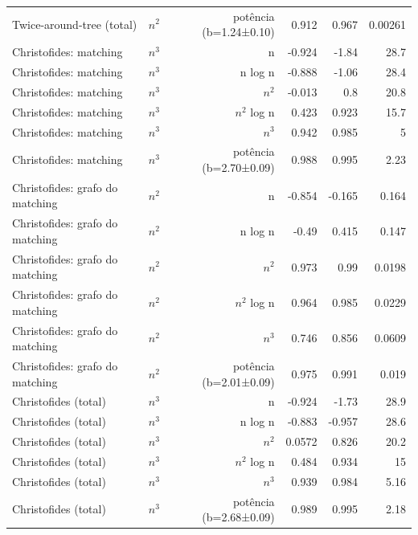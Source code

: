 \begin{tabular}{lrrrrr}
Twice-around-tree (total) & $n^{2}$ & potência (b=1.24±0.10) & 0.912 & 0.967 & 0.00261 \\
Christofides: matching & $n^{3}$ & n & -0.924 & -1.84 & 28.7 \\
Christofides: matching & $n^{3}$ & n log n & -0.888 & -1.06 & 28.4 \\
Christofides: matching & $n^{3}$ & $n^{2}$ & -0.013 & 0.8 & 20.8 \\
Christofides: matching & $n^{3}$ & $n^{2}$ log n & 0.423 & 0.923 & 15.7 \\
Christofides: matching & $n^{3}$ & $n^{3}$ & 0.942 & 0.985 & 5 \\
Christofides: matching & $n^{3}$ & potência (b=2.70±0.09) & 0.988 & 0.995 & 2.23 \\
Christofides: grafo do matching & $n^{2}$ & n & -0.854 & -0.165 & 0.164 \\
Christofides: grafo do matching & $n^{2}$ & n log n & -0.49 & 0.415 & 0.147 \\
Christofides: grafo do matching & $n^{2}$ & $n^{2}$ & 0.973 & 0.99 & 0.0198 \\
Christofides: grafo do matching & $n^{2}$ & $n^{2}$ log n & 0.964 & 0.985 & 0.0229 \\
Christofides: grafo do matching & $n^{2}$ & $n^{3}$ & 0.746 & 0.856 & 0.0609 \\
Christofides: grafo do matching & $n^{2}$ & potência (b=2.01±0.09) & 0.975 & 0.991 & 0.019 \\
Christofides (total) & $n^{3}$ & n & -0.924 & -1.73 & 28.9 \\
Christofides (total) & $n^{3}$ & n log n & -0.883 & -0.957 & 28.6 \\
Christofides (total) & $n^{3}$ & $n^{2}$ & 0.0572 & 0.826 & 20.2 \\
Christofides (total) & $n^{3}$ & $n^{2}$ log n & 0.484 & 0.934 & 15 \\
Christofides (total) & $n^{3}$ & $n^{3}$ & 0.939 & 0.984 & 5.16 \\
Christofides (total) & $n^{3}$ & potência (b=2.68±0.09) & 0.989 & 0.995 & 2.18 \\
\hline
\end{tabular}
